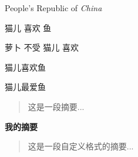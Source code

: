 \documentclass{ctexart}%
\newcommand\PRC{People's Republic of \emph{China}}%
\newcommand\loves[2]{#1 喜欢 #2}
\newcommand\hatedby[2]{#2 不受 #1 喜欢}
\newcommand\love[3][喜欢]{#2#1#3}
\newenvironment{myabstract}[1][摘要]%
{\small
	\begin{center}\bfseries #1\end{center}%
	\begin{quotation}}%
{	
	\end{quotation}
}
\begin{document}
	\PRC
	
	\loves{猫儿}{鱼}
	
	\hatedby{猫儿}{萝卜}
	
	\love{猫儿}{鱼}
	
	\love[最爱]{猫儿}{鱼}
	
	\begin{abstract}
		这是一段摘要...
	\end{abstract}
	
	\begin{myabstract}[我的摘要]
		这是一段自定义格式的摘要...
	\end{myabstract}
	
\end{document}
